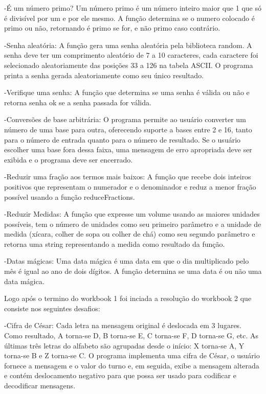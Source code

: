 -É um número primo? Um número primo é um número inteiro maior que 1 que só é divisível por um e por ele mesmo. A função determina se o numero colocado é primo ou não, retornando é primo se for, e não primo caso contrário. 

-Senha aleatória: A função gera uma senha aleatória pela biblioteca random. A senha deve ter um comprimento aleatório de 7 a 10 caracteres, cada caractere foi selecionado aleatoriamente das posições 33 a 126 na tabela ASCII. O programa printa a senha gerada aleatoriamente como seu único resultado.

-Verifique uma senha: A função que determina se uma senha é válida ou não e retorna senha ok se a senha passada for válida.

-Conversões de base arbitrária: O programa permite ao usuário converter um número de uma base para outra, oferecendo suporte a bases entre 2 e 16, tanto para o número de entrada quanto para o número de resultado. Se o usuário escolher uma base fora dessa faixa, uma mensagem de erro apropriada deve ser exibida e o programa deve ser encerrado.

-Reduzir uma fração aos termos mais baixos: A função que recebe dois inteiros positivos que representam o numerador e o denominador e reduz a menor fração possível usando a função reduceFractions. 

-Reduzir Medidas: A função que expresse um volume usando as maiores unidades possíveis, tem o número de unidades como seu primeiro parâmetro e a unidade de medida (xícara, colher de sopa ou colher de chá) como seu segundo parâmetro e retorna uma string representando a medida como resultado da função. 

-Datas mágicas: Uma data mágica é uma data em que o dia multiplicado pelo mês é igual ao ano de dois dígitos. A função determina se uma data é ou não uma data mágica. 

Logo após o termino do workbook 1 foi inciada a resolução do workbook 2 que consiste nos seguintes desafios:

-Cifra de César: Cada letra na mensagem original é deslocada em 3 lugares. Como resultado, A torna-se D, B torna-se E, C torna-se F, D torna-se G, etc. As últimas três letras do alfabeto são agrupadas desde o início: X torna-se A, Y torna-se B e Z torna-se C. 
O  programa implementa uma cifra de César, o usuário fornece a mensagem e o valor do turno e, em seguida, exibe a mensagem alterada e contém deslocamento negativo para que possa ser usado para codificar e decodificar mensagens.


